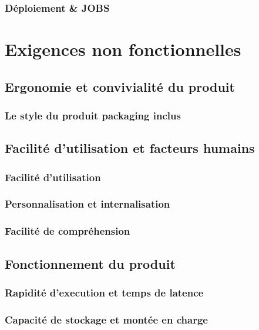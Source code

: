 \documentclass[12pt]{article}
\begin{document}
\subsubsection{Déploiement \& JOBS} 

\newpage
\section{Exigences non fonctionnelles}
\subsection{Ergonomie et convivialité du produit}
\subsubsection{Le style du produit packaging inclus}

\subsection{Facilité d'utilisation et facteurs humains}
\subsubsection{Facilité d'utilisation}
\subsubsection{Personnalisation et internalisation}
\subsubsection{Facilité de compréhension}


\subsection{Fonctionnement du produit}
\subsubsection{Rapidité d'execution et temps de latence}
\subsubsection{Capacité de stockage et montée en charge}
\end{document}
